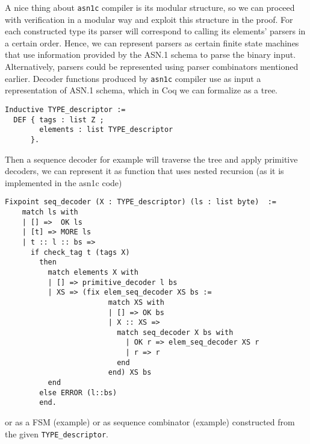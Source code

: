 \documentclass{article}
\begin{document}
A nice thing about \texttt{asn1c} compiler is its modular structure, so we can proceed with verification in a modular way and exploit this structure in the proof. For each constructed type its parser will correspond to calling its elements' parsers in a certain order. Hence, we can represent parsers as certain finite state machines that use information provided by the ASN.1 schema to parse the binary input. Alternatively, parsers could be represented using parser combinators mentioned earlier. Decoder functions produced by \texttt{asn1c} compiler use as input a representation of ASN.1 schema, which in Coq we can formalize as a tree.

 \begin{lstlisting}[language=Coq]
Inductive TYPE_descriptor :=
  DEF { tags : list Z ;
        elements : list TYPE_descriptor 
      }.
 \end{lstlisting}

Then a sequence decoder for example will traverse the tree and apply primitive decoders, we can represent it as function that uses nested recursion (as it is implemented in the asn1c code)
 
 \begin{lstlisting}[language=Coq]
 Fixpoint seq_decoder (X : TYPE_descriptor) (ls : list byte)  :=
    match ls with
    | [] =>  OK ls
    | [t] => MORE ls       
    | t :: l :: bs =>          
      if check_tag t (tags X)
        then
          match elements X with 
          | [] => primitive_decoder l bs 
          | XS => (fix elem_seq_decoder XS bs :=
                        match XS with
                        | [] => OK bs
                        | X :: XS =>
                          match seq_decoder X bs with
                            | OK r => elem_seq_decoder XS r 
                            | r => r
                          end
                        end) XS bs
          end
        else ERROR (l::bs)
        end.
 \end{lstlisting}

 or as a FSM (example) or as sequence combinator (example) constructed from the given \texttt{TYPE\_descriptor}. 


  
\end{document}

